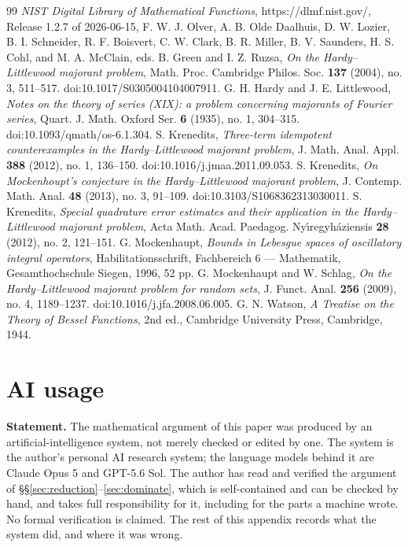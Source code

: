 \documentclass[11pt]{article}
\theoremstyle{plain}
\theoremstyle{definition}
\theoremstyle{remark}
\begin{document}
\begin{thebibliography}{99}
 \emph{NIST Digital Library of Mathematical Functions}, https://dlmf.nist.gov/, Release 1.2.7 of 2026-06-15, F. W. J. Olver, A. B. Olde Daalhuis, D. W. Lozier, B. I. Schneider, R. F. Boisvert, C. W. Clark, B. R. Miller, B. V. Saunders, H. S. Cohl, and M. A. McClain, eds.
 B. Green and I. Z. Ruzsa, \emph{On the Hardy--Littlewood majorant problem}, Math. Proc. Cambridge Philos. Soc. \textbf{137} (2004), no. 3, 511--517. doi:10.1017/S0305004104007911.
 G. H. Hardy and J. E. Littlewood, \emph{Notes on the theory of series (XIX): a problem concerning majorants of Fourier series}, Quart. J. Math. Oxford Ser. \textbf{6} (1935), no. 1, 304--315. doi:10.1093/qmath/os-6.1.304.
 S. Krenedits, \emph{Three-term idempotent counterexamples in the Hardy--Littlewood majorant problem}, J. Math. Anal. Appl. \textbf{388} (2012), no. 1, 136--150. doi:10.1016/j.jmaa.2011.09.053.
 S. Krenedits, \emph{On Mockenhoupt's conjecture in the Hardy--Littlewood majorant problem}, J. Contemp. Math. Anal. \textbf{48} (2013), no. 3, 91--109. doi:10.3103/S1068362313030011.
 S. Krenedits, \emph{Special quadrature error estimates and their application in the Hardy--Littlewood majorant problem}, Acta Math. Acad. Paedagog. Ny\'{\i}regyh\'aziensis \textbf{28} (2012), no. 2, 121--151.
 G. Mockenhaupt, \emph{Bounds in Lebesgue spaces of oscillatory integral operators}, Habilitationsschrift, Fachbereich 6 --- Mathematik, Gesamthochschule Siegen, 1996, 52 pp.
 G. Mockenhaupt and W. Schlag, \emph{On the Hardy--Littlewood majorant problem for random sets}, J. Funct. Anal. \textbf{256} (2009), no. 4, 1189--1237. doi:10.1016/j.jfa.2008.06.005.
 G. N. Watson, \emph{A Treatise on the Theory of Bessel Functions}, 2nd ed., Cambridge University Press, Cambridge, 1944.
\end{thebibliography}

\appendix

\section{AI usage}\label{app:ai}
\textbf{Statement.} The mathematical argument of this paper was produced by an artificial-intelligence system, not merely checked or edited by one. The system is the author's personal AI research system; the language models behind it are Claude Opus 5 and GPT-5.6 Sol. The author has read and verified the argument of \S\S\ref{sec:reduction}--\ref{sec:dominate}, which is self-contained and can be checked by hand, and takes full responsibility for it, including for the parts a machine wrote. No formal verification is claimed. The rest of this appendix records what the system did, and where it was wrong.
\end{document}
